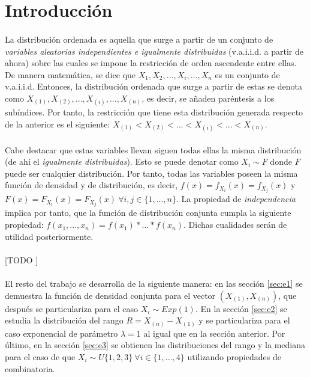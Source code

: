 \documentclass{article}
\begin{document}
  \maketitle


  \section{Introducción}

    \paragraph{}
    La distribución ordenada es aquella que surge a partir de un conjunto de \emph{variables aleatorias independientes e igualmente distribuidas} (v.a.i.i.d. a partir de ahora) sobre las cuales se impone la restricción de orden ascendente entre ellas. De manera matemática, se dice que $X_{1}, X_{2},...,X_{i}, ..., X_{n}$ es un conjunto de v.a.i.i.d. Entonces, la distribución ordenada que surge a partir de estas se denota como $X_{(1)}, X_{(2)}, ...,X_{(i)} ,..., X_{(n)}$, es decir, se añaden paréntesis a los subíndices. Por tanto, la restricción que tiene esta distribución generada respecto de la anterior es el siguiente: $X_{(1)} <  X_{(2)} < ... < X_{(i)} < ... < X_{(n)}$.

    \paragraph{}
    Cabe destacar que estas variables llevan siguen todas ellas la misma distribución (de ahí el \emph{igualmente distribuidas}). Esto se puede denotar como $X_{i} \sim F$ donde $F$ puede ser cualquier distribución. Por tanto, todas las variables poseen la misma función de densidad y de distribución, es decir, $f(x) = f_{X_i}(x) = f_{X_j}(x)$ y $F(x) = F_{X_i}(x) = F_{X_j}(x) \ \forall i,j \in \{1,..., n\}$. La propiedad de \emph{independencia} implica por tanto, que la función de distribución conjunta cumpla la siguiente propiedad: $f(x_1, ..., x_n) = f(x_1) * ... * f(x_n)$. Dichas cualidades serán de utilidad posteriormente.

    \paragraph{}
    [TODO ]

    \paragraph{}
    El resto del trabajo se desarrolla de la siguiente manera: en las sección \ref{sec:e1} se demuestra la función de densidad conjunta para el vector $(X_{(1)}, X_{(n)})$, que después se particulariza para el caso $X_i \sim Exp(1)$. En la sección \ref{sec:e2} se estudia la distribución del rango $R = X_{(n)} - X_{(1)}$ y se particulariza para el caso exponencial de parámetro $\lambda=1$ al igual que en la sección anterior. Por último, en la sección \ref{sec:e3} se obtienen las distribuciones del rango y la mediana para el caso de que $X_i \sim U\{1,2,3\} \ \forall i  \in \{1,...,4\}$ utilizando propiedades de combinatoria.
\end{document}
